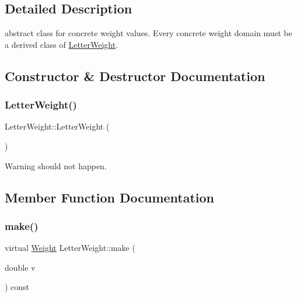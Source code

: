\subsection{Detailed Description}
abstract class for concrete weight values. Every concrete weight domain must be a derived class of \mbox{\hyperlink{classLetterWeight}{Letter\+Weight}}. 

\subsection{Constructor \& Destructor Documentation}
\mbox{\label{classLetterWeight_a2f9af55d38b8e7fd73af6cbbcb50971c}} 
\subsubsection{\texorpdfstring{LetterWeight()}{LetterWeight()}}
{\footnotesize\ttfamily Letter\+Weight\+::\+Letter\+Weight (\begin{DoxyParamCaption}{ }\end{DoxyParamCaption})\hspace{0.3cm}{\ttfamily [inline]}}

\begin{DoxyWarning}{Warning}
should not happen. 
\end{DoxyWarning}


\subsection{Member Function Documentation}
\mbox{\label{classLetterWeight_af1f898e0845f59299440fc50a58fd2f1}} 
\subsubsection{\texorpdfstring{make()}{make()}}
{\footnotesize\ttfamily virtual \mbox{\hyperlink{classWeight}{Weight}} Letter\+Weight\+::make (\begin{DoxyParamCaption}\item[{double}]{v }\end{DoxyParamCaption}) const\hspace{0.3cm}{\ttfamily [pure virtual]}}



